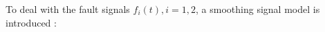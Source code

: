 \documentclass[journal,12pt,onecolumn,draftclsnofoot,]{IEEEtran}
\newtheorem{assumption}{Assumption}[section]
\begin{document}
To deal with the fault signals $f_i(t),i=1,2$, a smoothing signal model is introduced \cite{9306757}:
%
\end{document}

